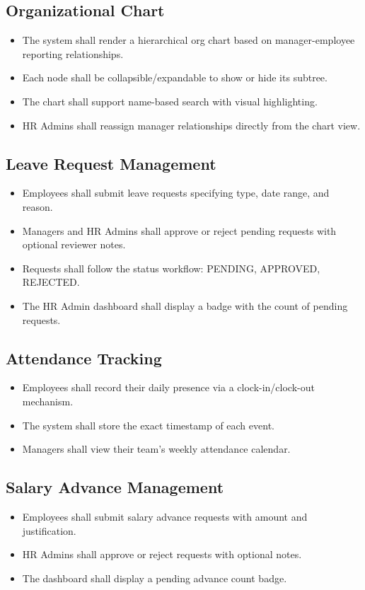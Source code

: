 \documentclass[12pt,a4paper]{report}
\begin{document}
\subsection{Organizational Chart}
\begin{itemize}
  \item The system shall render a hierarchical org chart based on manager-employee
    reporting relationships.
  \item Each node shall be collapsible/expandable to show or hide its subtree.
  \item The chart shall support name-based search with visual highlighting.
  \item HR Admins shall reassign manager relationships directly from the chart view.
\end{itemize}

\subsection{Leave Request Management}
\begin{itemize}
  \item Employees shall submit leave requests specifying type, date range, and reason.
  \item Managers and HR Admins shall approve or reject pending requests with
    optional reviewer notes.
  \item Requests shall follow the status workflow: PENDING, APPROVED, REJECTED.
  \item The HR Admin dashboard shall display a badge with the count of pending requests.
\end{itemize}

\subsection{Attendance Tracking}
\begin{itemize}
  \item Employees shall record their daily presence via a clock-in/clock-out mechanism.
  \item The system shall store the exact timestamp of each event.
  \item Managers shall view their team's weekly attendance calendar.
\end{itemize}

\subsection{Salary Advance Management}
\begin{itemize}
  \item Employees shall submit salary advance requests with amount and justification.
  \item HR Admins shall approve or reject requests with optional notes.
  \item The dashboard shall display a pending advance count badge.
\end{itemize}
\end{document}
